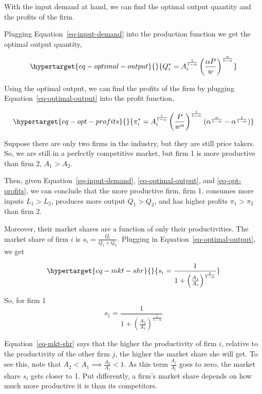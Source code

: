 \documentclass[
]{article}
\begin{document}
With the input demand at hand, we can find the optimal output quantity
and the profits of the firm.

Plugging Equation~\ref{eq-input-demand} into the production function we
get the optimal output quantity,

\begin{equation}\protect\hypertarget{eq-optimal-output}{}{
Q_i^* = A_i^{\frac{1}{1-\alpha}} \left(\frac{\alpha P}{w}\right)^{\frac{\alpha}{1-\alpha}}
}\label{eq-optimal-output}\end{equation}

Using the optimal output, we can find the profits of the firm by
plugging Equation~\ref{eq-optimal-output} into the profit function,

\begin{equation}\protect\hypertarget{eq-opt-profits}{}{
\pi_i^*=A_i^{\frac{1}{1-\alpha}}\left(\frac{ P}{w^{\alpha}}\right)^{\frac{1}{1-\alpha}}(\alpha^{\frac{\alpha}{1-\alpha}}-\alpha^{\frac{1}{1-\alpha}})
}\label{eq-opt-profits}\end{equation}

Suppose there are only two firms in the industry, but they are still
price takers. So, we are still in a perfectly competitive market, but
firm 1 is more productive than firm 2, \(A_1 >A_2\).

Then, given Equation~\ref{eq-input-demand}, \ref{eq-optimal-output}, and
\ref{eq-opt-profits}, we can conclude that the more productive firm,
firm 1, consumes more inputs \(L_1>L_2\), produces more output
\(Q_1>Q_2\), and has higher profits \(\pi_1>\pi_2\) than firm 2.

Moreover, their market shares are a function of only their
productivities. The market share of firm \(i\) is
\(s_i=\frac{Q_i}{Q_1+Q_2}\). Plugging in
Equation~\ref{eq-optimal-output}, we get

\begin{equation}\protect\hypertarget{eq-mkt-shr}{}{
s_i=\frac{1}{1+\left(\frac{A_j}{A_i}\right)^{\frac{1}{1-\alpha}}}
}\label{eq-mkt-shr}\end{equation}

So, for firm 1 \[
s_1=\frac{1}{1+\left(\frac{A_2}{A_1}\right)^{\frac{1}{1-\alpha}}}
\]

Equation~\ref{eq-mkt-shr} says that the higher the productivity of firm
\(i\), relative to the productivity of the other firm \(j\), the higher
the market share she will get. To see this, note that
\(A_2 < A_1 \implies \frac{A_2}{A_1} < 1\). As this term
\(\frac{A_j}{A_i}\) goes to zero, the market share \(s_i\) gets closer
to 1. Put differently, a firm's market share depends on how much more
productive it is than its competitors.
\end{document}
